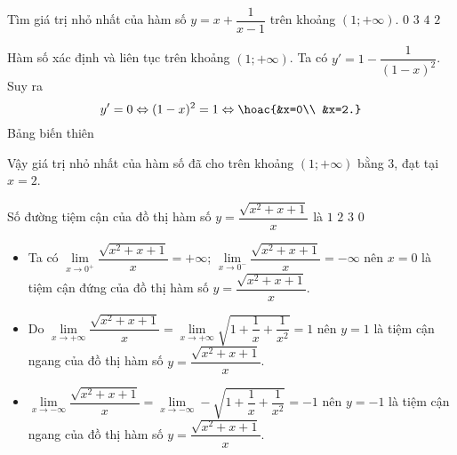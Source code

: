 \begin{ex}%
 Tìm giá trị nhỏ nhất của hàm số $y=x+\dfrac{1}{x-1}$ trên khoảng $(1;+\infty)$.
 \choice
  {$0$}
  {\True $3$}
  {$4$}
  {$2$}
 \loigiai
  {
  Hàm số xác định và liên tục trên khoảng $(1;+\infty)$. Ta có
  $y'=1-\dfrac{1}{(1-x)^2}$. Suy ra \[y'=0\Leftrightarrow (1-x)^2=1\Leftrightarrow \hoac{&x=0\\ &x=2.}\]
  Bảng biến thiên
  \begin{center}
  \end{center}
  Vậy giá trị nhỏ nhất của hàm số đã cho trên khoảng $(1;+\infty)$ bằng $3$, đạt tại $x=2$.
  }
\end{ex}

\begin{ex}%
 Số đường tiệm cận của đồ thị hàm số $y=\dfrac{\sqrt{x^2+x+1}}{x}$ là
 \choice
  {$1$}
  {$2$}
  {\True $3$}
  {$0$}
 \loigiai
  {
  \begin{itemize}
   \item Ta có $\lim\limits_{x \to 0^+} \dfrac{\sqrt{x^2+x+1}}{x}=+\infty$; $\lim\limits_{x \to 0^-} \dfrac{\sqrt{x^2+x+1}}{x}=-\infty $ nên $x=0$ là tiệm cận đứng của đồ thị hàm số $y=\dfrac{\sqrt{x^2+x+1}}{x}$.
   \item Do $\lim\limits_{x \to +\infty} \dfrac{\sqrt{x^2+x+1}}{x}=\lim\limits_{x \to +\infty} \sqrt{1+\dfrac{1}{x}+\dfrac{1}{x^2}}=1$ nên $y=1$ là tiệm cận ngang của đồ thị hàm số $y=\dfrac{\sqrt{x^2+x+1}}{x}$.
   \item $\lim\limits_{x \to -\infty} \dfrac{\sqrt{x^2+x+1}}{x}=\lim\limits_{x \to -\infty} -\sqrt{1+\dfrac{1}{x}+\dfrac{ 1}{x^2}}=-1$ nên $y=-1$ là tiệm cận ngang của đồ thị hàm số $y=\dfrac{\sqrt{x^2+x+1}}{x}$.
  \end{itemize}
  }
\end{ex}

